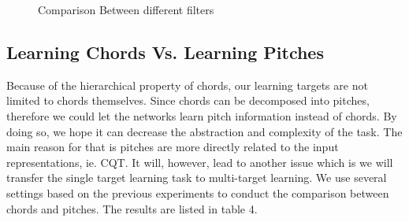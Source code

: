\documentclass{article}
\begin{document}
\begin{figure}
 \centerline{}
 \caption{Comparison Between different filters}
\end{figure}

\subsection{Learning Chords Vs. Learning Pitches}
Because of the hierarchical property of chords, our learning targets are not limited to chords themselves. Since chords can be decomposed into pitches, therefore we could let the networks learn pitch information instead of chords. By doing so, we hope it can decrease the abstraction and complexity of the task. The main reason for that is pitches are more directly related to the input representations, ie. CQT. It will, however, lead to another issue which is we will transfer the single target learning task to multi-target learning. We use several settings based on the previous experiments to conduct the comparison between chords and pitches. The results are listed in table 4. 
\end{document}
